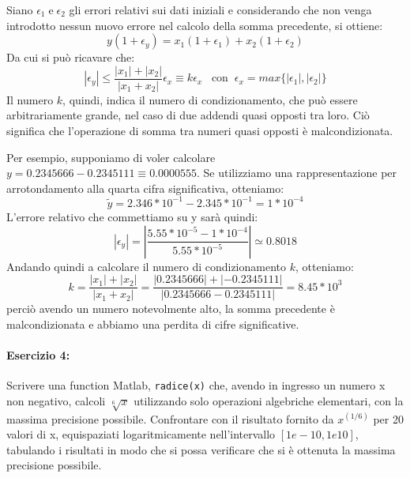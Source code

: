 \documentclass[12pt]{article}
\begin{document}
Siano \(\epsilon_1 \;\text{e}\; \epsilon_2\) gli errori relativi sui dati iniziali e considerando che non venga introdotto nessun nuovo errore nel calcolo della somma precedente, si ottiene:
$$ y(1+\epsilon_y)=x_1(1+\epsilon_1)+x_2(1+\epsilon_2)$$
Da cui si può ricavare che:
$$ |\epsilon_y|\leq \frac{|x_1|+|x_2|}{|x_1+x_2|}\epsilon_x\equiv k\epsilon_x \;\;\;\text{con}\;\; \epsilon_x = max\{|\epsilon_1|,|\epsilon_2|\} $$
Il numero \(k\), quindi, indica il numero di condizionamento, che può essere arbitrariamente grande, nel caso di due addendi quasi opposti tra loro. 
Ciò significa che l'operazione di somma tra numeri quasi opposti è malcondizionata.

Per esempio, supponiamo di voler calcolare \(y=0.2345666-0.2345111\equiv 0.0000555\). 
Se utilizziamo una rappresentazione per arrotondamento alla quarta cifra significativa, otteniamo:
$$\tilde{y}=2.346*10^{-1}-2.345*10^{-1} = 1*10^{-4}$$
L'errore relativo che commettiamo su y sarà quindi:
$$|\epsilon_y| = |\frac{5.55*10^{-5}-1*10^{-4}}{5.55*10^{-5}}|\simeq 0.8018$$
Andando quindi a calcolare il numero di condizionamento \(k\), otteniamo:
$$ k=\frac{|x_1|+|x_2|}{|x_1+x_2|}=\frac{|0.2345666|+|-0.2345111|}{|0.2345666-0.2345111|}=8.45*10^3$$
perciò avendo un numero notevolmente alto, la somma precedente è malcondizionata e abbiamo una perdita di cifre significative. 
\paragraph{Esercizio 4:}Scrivere una function Matlab, \texttt{radice(x)} che, avendo in ingresso un numero x non negativo, 
calcoli \(\sqrt[6]{x}\) utilizzando solo operazioni algebriche elementari, con la massima precisione possibile. Confrontare con il risultato fornito da 
\(x^{(1/6)}\) per 20 valori di x, equispaziati logaritmicamente nell’intervallo \([1e-10,1e10]\), tabulando i risultati in modo che si possa verificare che si è ottenuta la massima precisione possibile.
\end{document}
